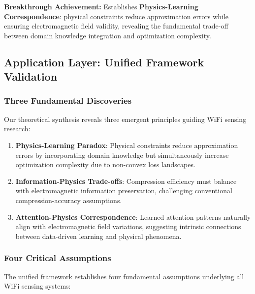 \documentclass[journal]{IEEEtran}
\begin{document}
\textbf{Breakthrough Achievement:} Establishes \textbf{Physics-Learning Correspondence}: physical constraints reduce approximation errors while ensuring electromagnetic field validity, revealing the fundamental trade-off between domain knowledge integration and optimization complexity.

\subsection{Application Layer: Unified Framework Validation}

\subsubsection{Three Fundamental Discoveries}

Our theoretical synthesis reveals three emergent principles guiding WiFi sensing research:

\begin{enumerate}
\item \textbf{Physics-Learning Paradox}: Physical constraints reduce approximation errors by incorporating domain knowledge but simultaneously increase optimization complexity due to non-convex loss landscapes.

\item \textbf{Information-Physics Trade-offs}: Compression efficiency must balance with electromagnetic information preservation, challenging conventional compression-accuracy assumptions.

\item \textbf{Attention-Physics Correspondence}: Learned attention patterns naturally align with electromagnetic field variations, suggesting intrinsic connections between data-driven learning and physical phenomena.
\end{enumerate}

\subsubsection{Four Critical Assumptions}

The unified framework establishes four fundamental assumptions underlying all WiFi sensing systems:
\end{document}
